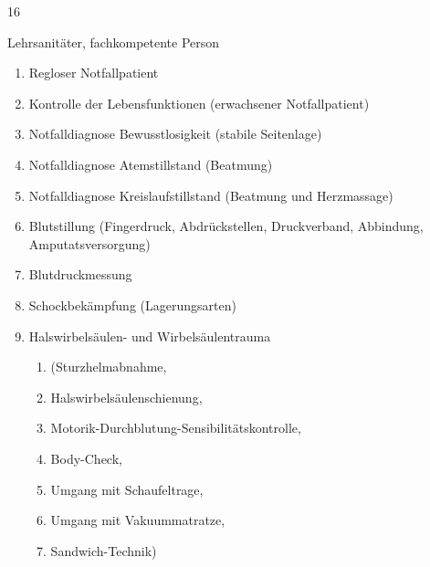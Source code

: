   \begin{inparadesc}
    \item[Stundenanzahl:] 16
    \item[Lehrkraft:] Lehrsanitäter, fachkompetente Person
  \end{inparadesc}
  
  \begin{enumerate}
    \item Regloser Notfallpatient \dotfill {}
    \item    Kontrolle der  Lebensfunktionen  (erwachsener Notfallpatient)
    \dotfill
    \item    Notfalldiagnose Bewusstlosigkeit (stabile Seitenlage)
    \dotfill
    \item    Notfalldiagnose Atemstillstand (Beatmung)
    \dotfill
    \item    Notfalldiagnose Kreislaufstillstand (Beatmung und Herzmassage)
    \dotfill
    \item    Blutstillung (Fingerdruck, Abdrückstellen, Druckverband, Abbindung, Amputatsversorgung)
    \dotfill
    \item    Blutdruckmessung
    \dotfill
    \item    Schockbekämpfung (Lagerungsarten)
    \dotfill
    \item
    Halswirbelsäulen- und Wirbelsäulentrauma
    \dotfill
    \begin{enumerate}
      \item      (Sturzhelmabnahme,
      \dotfill
      \item      Halswirbelsäulenschienung,
      \dotfill
      \item      Motorik-Durchblutung-Sensibilitätskontrolle,
      \dotfill
      \item      Body-Check,
      \dotfill
      \item      Umgang mit Schaufeltrage,
      \dotfill
      \item      Umgang mit Vakuummatratze,
      \dotfill
      \item      Sandwich-Technik)

\end{enumerate}
\end{enumerate}
